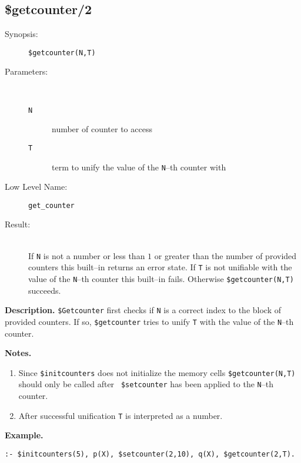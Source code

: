 %
%
%
\subsection{\$getcounter/2}

\begin{description}
\item[Synopsis:]
	{\tt \$getcounter(N,T)}
\item[Parameters:]\ \\[-0.5cm]
	\begin{description}
	\item[{\tt N}] number of counter to access
	\item[{\tt T}] term to unify the value of the {\tt N}--th
                       counter with
	\end{description}
\item[Low Level Name:]
	{\tt get\_counter}
\item[Result:]\ \\
        If {\tt N} is not a number or less than $1$ or greater than
        the number of provided counters this built--in returns an
        error state.
        If {\tt T} is not unifiable with the value of the {\tt N}--th
        counter this built--in fails.
        Otherwise {\tt \$getcounter(N,T)} succeeds.
\end{description}

\vspace*{0.5cm}
\noindent
{\bf Description.}
{\tt \$Getcounter} first checks if {\tt N} is a correct index to the
block of provided counters. If so, {\tt \$getcounter} tries to unify
{\tt T} with the value of the {\tt N}--th counter.

\vspace*{0.5cm}
\noindent
{\bf Notes.}
\begin{enumerate}
\item{Since {\tt \$initcounters} does not initialize the memory cells
      {\tt \$getcounter(N,T)} should only be called after {\tt
      \$setcounter} has been applied to the {\tt N}--th counter.}
\item{After successful unification {\tt T} is interpreted as a
      number.} 
\end{enumerate}

\vspace*{0.5cm}
\noindent
{\bf Example.}
\begin{verbatim}
:- $initcounters(5), p(X), $setcounter(2,10), q(X), $getcounter(2,T).
\end{verbatim}


